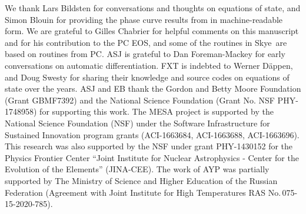 \documentclass[twocolumn]{aastex631}
\newcommand{\skye}{Skye}
\begin{document}

















\begin{acknowledgments}


We thank Lars Bildsten for conversations and thoughts on equations of state,
and Simon Blouin for providing the phase curve results from \citet{Blouin2020} in machine-readable form.
We are grateful to Gilles Chabrier for helpful comments on this manuscript and for his contribution to the PC EOS, and some of the routines in \skye\ are based on routines from PC.
ASJ is grateful to Dan Foreman-Mackey for early conversations on automatic differentiation.
FXT is indebted to Werner D\"{a}ppen, and Doug Swesty for sharing their knowledge and source codes on equations of state over the years.
ASJ and EB thank the Gordon and Betty Moore Foundation (Grant GBMF7392) and the National Science Foundation (Grant No. NSF PHY-1748958) for supporting this work.
The MESA project is supported by the National Science Foundation (NSF) under the Software Infrastructure for Sustained Innovation
program grants (ACI-1663684, ACI-1663688, ACI-1663696).
This research was also supported by the NSF under grant PHY-1430152 for the Physics Frontier Center
``Joint Institute for Nuclear Astrophysics - Center for the Evolution of the Elements'' (JINA-CEE).
The work of AYP was partially supported by The Ministry of Science and Higher Education of the Russian Federation
(Agreement with Joint Institute for High Temperatures RAS No.\,075-15-2020-785).

\end{acknowledgments}


\clearpage

\appendix








\end{document}
